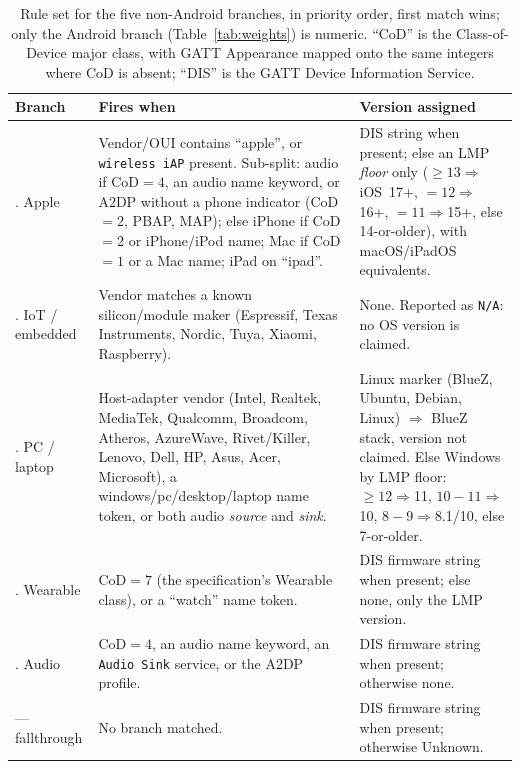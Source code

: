 \documentclass[conference]{IEEEtran}
\begin{document}
\begin{table}[t]
\centering
\footnotesize
\setlength{\tabcolsep}{3.5pt}
\renewcommand{\arraystretch}{1.15}
\caption{Rule set for the five non-Android branches, in priority order, first
match wins; only the Android branch (Table~\ref{tab:weights}) is numeric.
``CoD'' is the Class-of-Device major class, with GATT Appearance mapped onto
the same integers where CoD is absent; ``DIS'' is the GATT Device Information
Service.}
\label{tab:branches}
\begin{tabular}{@{}>{\raggedright\arraybackslash}p{1.35cm}
                  >{\raggedright\arraybackslash}p{3.4cm}
                  >{\raggedright\arraybackslash}p{2.6cm}@{}}
\toprule
\textbf{Branch} & \textbf{Fires when} & \textbf{Version assigned} \\
\midrule
1. Apple &
Vendor/OUI contains ``apple'', or \texttt{wireless iAP} present. Sub-split:
audio if CoD${=}4$, an audio name keyword, or A2DP without a phone indicator
(CoD${=}2$, PBAP, MAP); else iPhone if CoD${=}2$ or iPhone/iPod name; Mac if
CoD${=}1$ or a Mac name; iPad on ``ipad''. &
DIS string when present; else an LMP \emph{floor} only
(${\ge}13\Rightarrow$iOS~17+, ${=}12\Rightarrow$16+, ${=}11\Rightarrow$15+,
else 14-or-older), with macOS/iPadOS equivalents. \\
\addlinespace
3. IoT / embedded &
Vendor matches a known silicon/module maker (Espressif, Texas
Instruments, Nordic, Tuya, Xiaomi, Raspberry). &
None. Reported as \texttt{N/A}: no OS version is claimed. \\
\addlinespace
4. PC / laptop &
Host-adapter vendor (Intel, Realtek, MediaTek, Qualcomm, Broadcom, Atheros,
AzureWave, Rivet/Killer, Lenovo, Dell, HP, Asus, Acer, Microsoft), a
windows/pc/desktop/laptop name token, or both audio \emph{source} and
\emph{sink}. &
Linux marker (BlueZ, Ubuntu, Debian, Linux) $\Rightarrow$ BlueZ stack,
version not claimed. Else Windows by LMP floor: ${\ge}12\Rightarrow$11,
$10\!-\!11\Rightarrow$10, $8\!-\!9\Rightarrow$8.1/10, else 7-or-older. \\
\addlinespace
5. Wearable &
CoD${=}7$ (the specification's Wearable class), or a ``watch'' name token. &
DIS firmware string when present; else none, only the LMP version. \\
\addlinespace
6. Audio &
CoD${=}4$, an audio name keyword, an \texttt{Audio Sink} service, or the
A2DP profile. &
DIS firmware string when present; otherwise none. \\
\addlinespace
--- fallthrough &
No branch matched. &
DIS firmware string when present; otherwise Unknown. \\
\bottomrule
\end{tabular}
\end{table}
\end{document}
